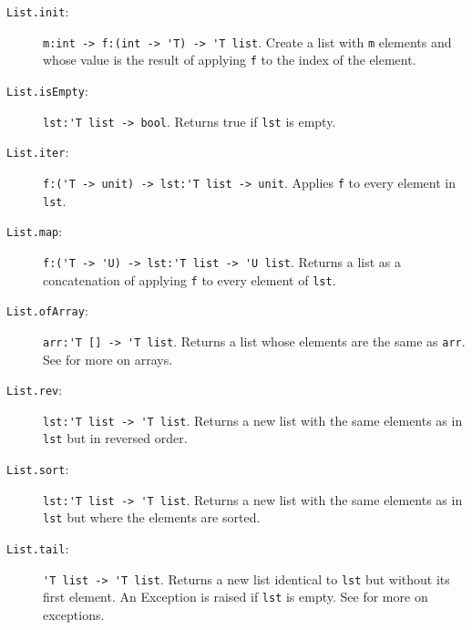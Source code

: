 \documentclass[fsharpnotes.tex]{subfiles}
\begin{document}
\begin{description}
\item[\texttt{List.init}:] \lstinline{m:int -> f:(int -> 'T) -> 'T list}. Create a list with \lstinline{m} elements and whose value is the result of applying \lstinline{f} to the index of the element.
\item[\texttt{List.isEmpty}:]  \lstinline{lst:'T list -> bool}. Returns true if \lstinline{lst} is empty.
\item[\texttt{List.iter}:] \lstinline{f:('T -> unit) -> lst:'T list -> unit}. Applies \lstinline{f} to every element in \lstinline{lst}.
\item[\texttt{List.map}:] \lstinline{f:('T -> 'U) -> lst:'T list -> 'U list}. Returns a list as a concatenation of applying \lstinline{f} to every element of \lstinline{lst}.
\item[\texttt{List.ofArray}:] \lstinline{arr:'T [] -> 'T list}. Returns a list whose elements are the same as \lstinline{arr}. See  for more on arrays.
\item[\texttt{List.rev}:] \lstinline{lst:'T list -> 'T list}. Returns a new list with the same elements as in \lstinline{lst} but in reversed order.
\item[\texttt{List.sort}:] \lstinline{lst:'T list -> 'T list}. Returns a new list with the same elements as in \lstinline{lst} but where the elements are sorted.
\item[\texttt{List.tail}:]  \lstinline{'T list -> 'T list}. Returns a new list identical to \lstinline{lst} but without its first element. An Exception is raised if \lstinline{lst} is empty.  See  for more on exceptions.

\end{description}
\end{document}
